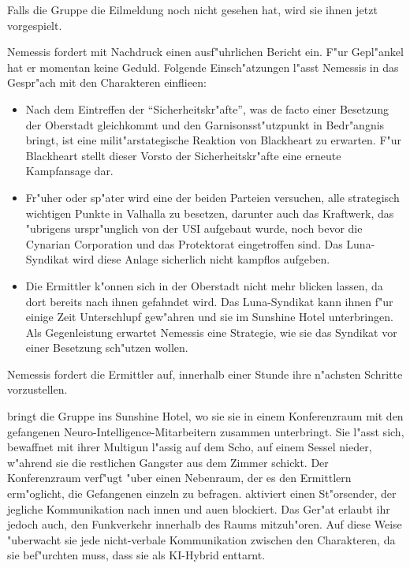 
Falls die Gruppe die Eilmeldung noch nicht gesehen hat, wird sie ihnen jetzt vorgespielt.


Nemessis fordert mit Nachdruck einen ausf"uhrlichen Bericht ein. F"ur Gepl"ankel hat er momentan keine Geduld. Folgende Einsch"atzungen l"asst Nemessis in das Gespr"ach mit den Charakteren einflie\3en:

\begin{itemize}
	\item Nach dem Eintreffen der ``Sicherheitskr"afte'', was de facto einer Besetzung der Oberstadt gleichkommt und den Garnisonsst"utzpunkt 
		in Bedr"angnis bringt, ist eine milit"arstategische Reaktion von Blackheart zu erwarten. F"ur Blackheart stellt dieser Vorsto\3 der Sicherheitskr"afte eine erneute Kampfansage dar.
	\item Fr"uher oder sp"ater wird eine der beiden Parteien versuchen, alle strategisch wichtigen Punkte in Valhalla zu besetzen, darunter 
		auch das Kraftwerk, das "ubrigens urspr"unglich von der USI aufgebaut wurde, noch bevor die Cynarian Corporation und das Protektorat eingetroffen sind. Das Luna-Syndikat wird diese Anlage sicherlich nicht kampflos aufgeben.
	\item Die Ermittler k"onnen sich in der Oberstadt nicht mehr blicken lassen, da dort bereits nach ihnen gefahndet wird. Das 
		Luna-Syndikat kann ihnen f"ur einige Zeit Unterschlupf gew"ahren und sie im Sunshine Hotel unterbringen. Als Gegenleistung erwartet Nemessis eine Strategie, wie sie das Syndikat vor einer Besetzung sch"utzen wollen.
\end{itemize}

Nemessis fordert die Ermittler auf, innerhalb einer Stunde ihre n"achsten Schritte vorzustellen.


\xl{} bringt die Gruppe ins Sunshine Hotel, wo sie sie in einem Konferenzraum mit den gefangenen Neuro-Intelligence-Mitarbeitern zusammen unterbringt. Sie l"asst sich, bewaffnet mit ihrer Multigun l"assig auf dem Scho\3, auf einem Sessel nieder, w"ahrend sie die restlichen Gangster aus dem Zimmer schickt. Der Konferenzraum verf"ugt "uber einen Nebenraum, der es den Ermittlern erm"oglicht, die Gefangenen einzeln zu befragen. \xl{} aktiviert einen St"orsender, der jegliche Kommunikation nach innen und au\3en blockiert. Das Ger"at erlaubt ihr jedoch auch, den Funkverkehr innerhalb des Raums mitzuh"oren. Auf diese Weise "uberwacht sie jede nicht-verbale Kommunikation zwischen den Charakteren, da sie bef"urchten muss, dass \ml{} sie als KI-Hybrid enttarnt.

